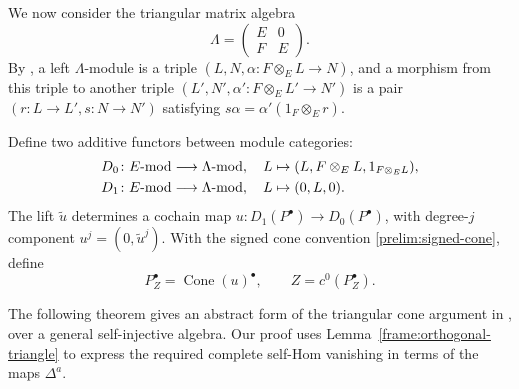 \documentclass[11pt]{article}
\begin{document}
We now consider the triangular matrix algebra
$$\Lambda=\begin{pmatrix}E&0\\F&E\end{pmatrix}.$$
By \cite[Chapter III.2]{ARS}, a left $\Lambda$-module is a triple $(L, N, \alpha:F\otimes_E L\to N)$, and a morphism from this triple to another triple $(L', N',\alpha': F\otimes_E L'\to N')$ is a pair $(r: L\to L', s: N\to N')$ satisfying
$s\alpha=\alpha'(1_F\otimes_E r)$.

Define two additive functors between module categories:
\[
\begin{aligned}
D_0\colon E\mbox{{\rm -mod}}&\longrightarrow\Lambda\mbox{{\rm -mod}},\quad L\mapsto(L,F\otimes_E L,1_{F\otimes_E L}),
\\
D_1\colon E\mbox{{\rm -mod}}&\longrightarrow\Lambda\mbox{{\rm -mod}},\quad L\mapsto(0,L,0).
\end{aligned}
\]
The lift $\widetilde u$ determines a cochain map
$u:D_1(P^\bullet)\to D_0(P^\bullet)$, with degree-$j$ component
$u^j=(0,\widetilde u^j)$.
With the signed cone convention \eqref{prelim:signed-cone}, define
$$P_Z^\bullet=\operatorname{Cone}(u)^\bullet,\qquad Z=c^0(P_Z^\bullet).$$

The following theorem gives an abstract form of the triangular cone
argument in \cite[Sections~7.2--7.3]{O}, over a general self-injective
algebra. Our proof uses Lemma~\ref{frame:orthogonal-triangle} to
express the required complete self-Hom vanishing in terms of the maps
$\Delta^a$.
\end{document}
